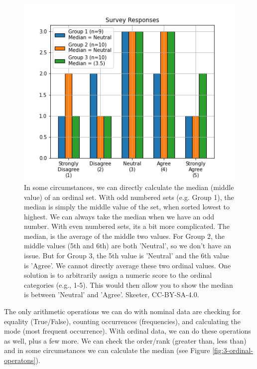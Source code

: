 \documentclass[
]{book}
\begin{document}
\begin{figure}
\includegraphics[width=0.75\linewidth]{images/03-ordinal-operatons} \caption{In some circumstances, we can directly calculate the median (middle value) of an ordinal set. With odd numbered sets (e.g. Group 1), the median is simply the middle value of the set, when sorted lowest to highest. We can always take the median when we have an odd number.  With even numbered sets, its a bit more complicated.  The median, is the average of the middle two values. For Group 2, the middle values (5th and 6th) are both 'Neutral', so we don't have an issue. But for Group 3, the 5th value is 'Neutral' and the 6th value is 'Agree'. We cannot directly average these two ordinal values. One solution is to arbitrarily assign a numeric score to the ordinal categories (e.g., 1-5). This would then allow you to show the median is between 'Neutral' and 'Agree'. Skeeter, CC-BY-SA-4.0.}\label{fig:3-ordinal-operations}
\end{figure}

The only arithmetic operations we can do with nominal data are checking for equality (True/False), counting occurrences (frequencies), and calculating the mode (most frequent occurrence). With ordinal data, we can do these operations as well, plus a few more. We can check the order/rank (greater than, less than) and in some circumstances we can calculate the median (see Figure \ref{fig:3-ordinal-operatons}).
\end{document}
